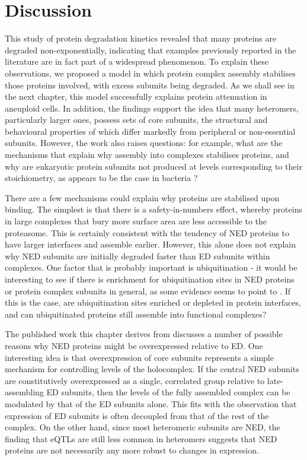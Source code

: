 \documentclass[a4paper,11pt,twoside,openright]{scrbook}
\begin{document}
\section{Discussion}

This study of protein degradation kinetics revealed that many proteins are degraded non-exponentially, indicating that examples previously reported in the literature are in fact part of a widespread phenomenon. To explain these observations, we proposed a model in which protein complex assembly stabilises those proteins involved, with excess subunits being degraded. As we shall see in the next chapter, this model successfully explains protein attenuation in aneuploid cells. In addition, the findings support the idea that many heteromers, particularly larger ones, possess sets of core subunits, the structural and behavioural properties of which differ markedly from peripheral or non-essential subunits. However, the work also raises questions: for example, what are the mechanisms that explain why assembly into complexes stabilises proteins, and why are eukaryotic protein subunits not produced at levels corresponding to their stoichiometry, as appears to be the case in bacteria \cite{Li2014b}?

There are a few mechanisms could explain why proteins are stabilised upon binding. The simplest is that there is a safety-in-numbers effect, whereby proteins in large complexes that bury more surface area are less accessible to the proteasome. This is certainly consistent with the tendency of NED proteins to have larger interfaces and assemble earlier. However, this alone does not explain why NED subunits are initially degraded faster than ED subunits within complexes. One factor that is probably important is ubiquitination - it would be interesting to see if there is enrichment for ubiquitination sites in NED proteins or protein complex subunits in general, as some evidence seems to point to \cite{Chen2014}. If this is the case, are ubiquitination sites enriched or depleted in protein interfaces, and can ubiquitinated proteins still assemble into functional complexes?

The published work this chapter derives from discusses a number of possible reasons why NED proteins might be overexpressed relative to ED. One interesting idea is that overexpression of core subunits represents a simple mechanism for controlling levels of the holocomplex. If the central NED subunits are constitutively overexpressed as a single, correlated group relative to late-assembling ED subunits, then the levels of the fully assembled complex can be modulated by that of the ED subunits alone. This fits with the observation that expression of ED subunits is often decoupled from that of the rest of the complex. On the other hand, since most heteromeric subunits are NED, the finding that eQTLs are still less common in heteromers suggests that NED proteins are not necessarily any more robust to changes in expression.
\end{document}
